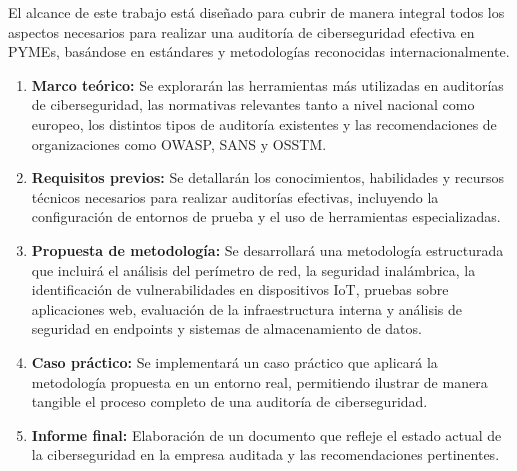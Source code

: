 \documentclass[a4paper, 10pt]{article}
\begin{document}
El alcance de este trabajo está diseñado para cubrir de manera integral todos los aspectos necesarios para realizar una auditoría de ciberseguridad efectiva en PYMEs, basándose en estándares y metodologías reconocidas internacionalmente.

\begin{enumerate}
    \item \textbf{Marco teórico:} Se explorarán las herramientas más utilizadas en auditorías de ciberseguridad, las normativas relevantes tanto a nivel nacional como europeo, los distintos tipos de auditoría existentes y las recomendaciones de organizaciones como OWASP, SANS y OSSTM.
    
    \item \textbf{Requisitos previos:} Se detallarán los conocimientos, habilidades y recursos técnicos necesarios para realizar auditorías efectivas, incluyendo la configuración de entornos de prueba y el uso de herramientas especializadas.
        
    \item \textbf{Propuesta de metodología:} Se desarrollará una metodología estructurada que incluirá el análisis del perímetro de red, la seguridad inalámbrica, la identificación de vulnerabilidades en dispositivos IoT, pruebas sobre aplicaciones web, evaluación de la infraestructura interna y análisis de seguridad en endpoints y sistemas de almacenamiento de datos.
    
    \item \textbf{Caso práctico:} Se implementará un caso práctico que aplicará la metodología propuesta en un entorno real, permitiendo ilustrar de manera tangible el proceso completo de una auditoría de ciberseguridad.
    
    \item \textbf{Informe final:} Elaboración de un documento que refleje el estado actual de la ciberseguridad en la empresa auditada y las recomendaciones pertinentes.
\end{enumerate}
\end{document}
